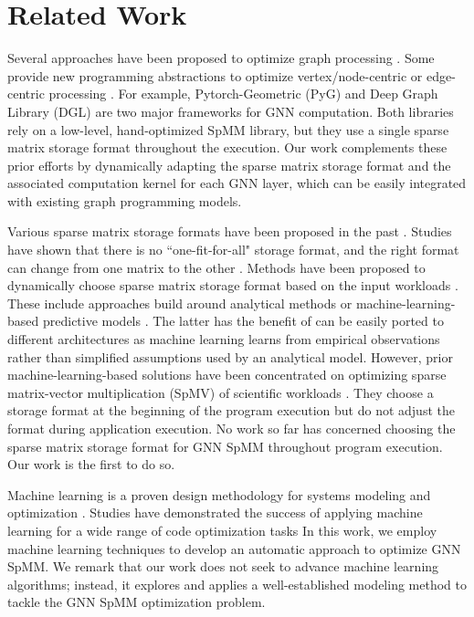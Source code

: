 \vspace{-5mm}
\section{Related Work}
\vspace{-4mm}

Several approaches have been proposed to optimize graph processing \cite{xie2020gnns}. Some provide new programming abstractions to
optimize vertex/node-centric or edge-centric  processing \cite{zhou2020graph}. For example, Pytorch-Geometric (PyG)
\cite{fey2019fast} and Deep Graph Library (DGL) \cite{wang2019deep} are two major frameworks for GNN computation. Both libraries rely on a
low-level, hand-optimized SpMM library, but they use a single sparse matrix storage format throughout the execution. %
Our work complements these prior efforts by dynamically adapting the sparse matrix storage format and the associated computation kernel for
each GNN layer, which can be easily integrated with existing graph programming models.

Various sparse matrix storage formats have been proposed in the past \cite{langr2015evaluation}. Studies have shown
that there is no ``one-fit-for-all" storage format, and the right format can change from one matrix to the other
\cite{li2013smat,chen2020characterizing}. Methods have been proposed to dynamically choose sparse matrix storage format based on the input
workloads \cite{sedaghati2015automatic}. These include approaches build around analytical methods \cite{venkat2015loop} or
machine-learning-based predictive models \cite{chen2019optimizing}. The latter has the benefit of can be easily ported to different
architectures as machine learning learns from empirical observations rather than simplified assumptions used by an analytical model.
However, prior machine-learning-based solutions have been concentrated on optimizing sparse matrix-vector multiplication (SpMV) of
scientific workloads \cite{zhao2018bridging}. They choose a storage format at the beginning of the program execution but do not adjust the
format during application execution. No work so far has concerned choosing the sparse matrix storage format for GNN SpMM throughout program
execution. Our work is the first to do so.

Machine learning is a proven design methodology for systems modeling and optimization \cite{wang2009mapping,ren2017optimise,wang2018machine,zhang2018auto,wang2014integrating,zhang2020optimizing}. Studies have demonstrated
the success of applying machine learning for a wide range of code optimization tasks
\cite{tournavitis2009towards,wang2014automatic,cummins2017end,wang2010partitioning,ye2020deep,wang2020combining} In this work,
we employ machine learning techniques to develop an automatic approach to optimize GNN SpMM. We remark that our work does not seek to
advance machine learning algorithms; instead, it explores and applies a well-established modeling method to tackle the GNN SpMM
optimization problem.
